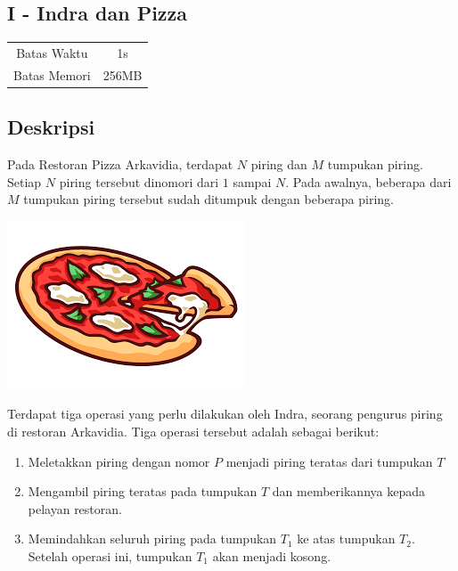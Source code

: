 \documentclass{article}
\begin{document}
\begin{center}
    \section*{I - Indra dan Pizza} %

    \begin{tabular}{ | c c | }
        \hline
        Batas Waktu  & 1s \\    %
        Batas Memori & 256MB \\  %
        \hline
    \end{tabular}
\end{center}

\subsection*{Deskripsi}

Pada Restoran Pizza Arkavidia, terdapat $N$ piring dan $M$ tumpukan piring. Setiap $N$ piring tersebut dinomori dari $1$ sampai $N$. Pada awalnya, beberapa dari $M$ tumpukan piring tersebut sudah ditumpuk dengan beberapa piring.

\begin{center}

\includegraphics[scale=0.5]{pizza.png}

\end{center}

Terdapat tiga operasi yang perlu dilakukan oleh Indra, seorang pengurus piring di restoran Arkavidia. Tiga operasi tersebut adalah sebagai berikut:

\begin{enumerate}
\item Meletakkan piring dengan nomor $P$ menjadi piring teratas dari tumpukan $T$
\item Mengambil piring teratas pada tumpukan $T$ dan memberikannya kepada pelayan restoran.
\item Memindahkan seluruh piring pada tumpukan $T_1$ ke atas tumpukan $T_2$. Setelah operasi ini, tumpukan $T_1$ akan menjadi kosong.
\end{enumerate}
\end{document}
